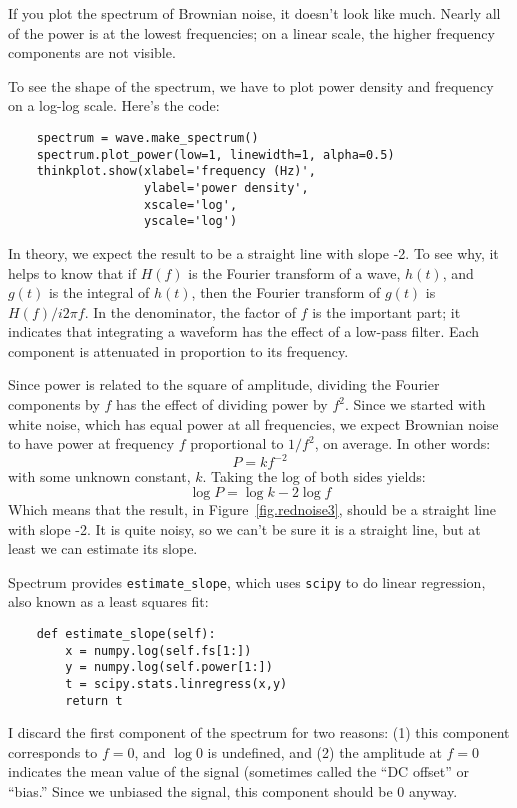 \documentclass[12pt]{book}
\begin{document}
If you plot the spectrum of Brownian noise, it doesn't look like
much.  Nearly all of the power is at the lowest frequencies; on a
linear scale, the higher frequency components are not visible.

To see the shape of the spectrum, we have to plot power density
and frequency on a log-log scale.  Here's the code:

\begin{verbatim}
    spectrum = wave.make_spectrum()
    spectrum.plot_power(low=1, linewidth=1, alpha=0.5)
    thinkplot.show(xlabel='frequency (Hz)',
                   ylabel='power density',
                   xscale='log',
                   yscale='log')
\end{verbatim}

In theory, we expect the result to be a straight line with slope -2.
To see why, it helps to know that if $H(f)$ is the Fourier transform
of a wave, $h(t)$, and $g(t)$ is the integral of $h(t)$, then the
Fourier transform of $g(t)$ is $H(f) / i 2 \pi f$.  In the denominator,
the factor of $f$ is the important part; it indicates
that integrating a waveform has the effect of a low-pass filter.
Each component is attenuated in proportion to its frequency.

Since power is related to the square of amplitude, dividing the
Fourier components by $f$ has the effect of dividing power by $f^2$.
Since we started with white noise, which has equal power at all
frequencies, we expect Brownian noise to have power at frequency $f$
proportional to $1/f^2$, on average.  In other words:
%
\[ P = k f^{-2} \]
%
with some unknown constant, $k$.  Taking the log of both sides yields:
%
\[ \log P = \log k -2 \log f \]
%
Which means that the result, in Figure~\ref{fig.rednoise3}, should be
a straight line with slope -2.  It is quite noisy, so we can't
be sure it is a straight line, but at least we can estimate
its slope.

Spectrum provides \verb"estimate_slope", which uses {\tt scipy}
to do linear regression, also known as a least squares fit:

\begin{verbatim}
    def estimate_slope(self):
        x = numpy.log(self.fs[1:])
        y = numpy.log(self.power[1:])
        t = scipy.stats.linregress(x,y)
        return t
\end{verbatim}

I discard the first component of the spectrum for two reasons: (1)
this component corresponds to $f=0$, and $\log 0$ is undefined,
and (2) the amplitude at $f=0$ indicates the mean value of the signal
(sometimes called the ``DC offset'' or ``bias.''  Since we unbiased
the signal, this component should be 0 anyway.
\end{document}
